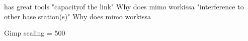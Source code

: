 has great tools
"capacityof the link" Why does mimo workissa
"interference to other base station(s)" Why does mimo workissa

Gimp scaling = 500 
